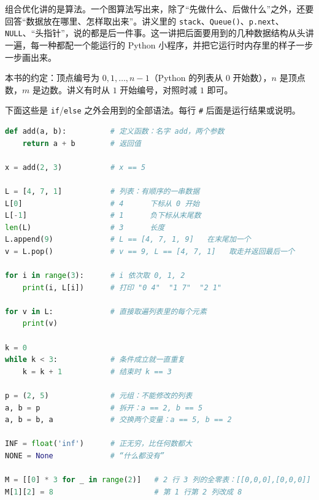 \label{lec:data-structures}

组合优化讲的是算法。一个图算法写出来，除了“先做什么、后做什么”之外，还要回答“数据放在哪里、怎样取出来”。讲义里的 \texttt{stack}、\texttt{Queue()}、\texttt{p.next}、\texttt{NULL}、“头指针”，说的都是后一件事。这一讲把后面要用到的几种数据结构从头讲一遍，每一种都配一个能运行的 Python 小程序，并把它运行时内存里的样子一步一步画出来。

本书的约定：顶点编号为 $0,1,\dots,n-1$（Python 的列表从 $0$ 开始数），$n$ 是顶点数，$m$ 是边数。讲义有时从 $1$ 开始编号，对照时减 $1$ 即可。


下面这些是 \texttt{if}/\texttt{else} 之外会用到的全部语法。每行 \texttt{\#} 后面是运行结果或说明。

\begin{lstlisting}[language=Python,style=frag]
def add(a, b):          # 定义函数：名字 add，两个参数
    return a + b        # 返回值

x = add(2, 3)           # x == 5

L = [4, 7, 1]           # 列表：有顺序的一串数据
L[0]                    # 4      下标从 0 开始
L[-1]                   # 1      负下标从末尾数
len(L)                  # 3      长度
L.append(9)             # L == [4, 7, 1, 9]   在末尾加一个
v = L.pop()             # v == 9, L == [4, 7, 1]   取走并返回最后一个

for i in range(3):      # i 依次取 0, 1, 2
    print(i, L[i])      # 打印 "0 4"  "1 7"  "2 1"

for v in L:             # 直接取遍列表里的每个元素
    print(v)

k = 0
while k < 3:            # 条件成立就一直重复
    k = k + 1           # 结束时 k == 3

p = (2, 5)              # 元组：不能修改的列表
a, b = p                # 拆开：a == 2, b == 5
a, b = b, a             # 交换两个变量：a == 5, b == 2

INF = float('inf')      # 正无穷，比任何数都大
NONE = None             # “什么都没有”

M = [[0] * 3 for _ in range(2)]   # 2 行 3 列的全零表：[[0,0,0],[0,0,0]]
M[1][2] = 8                       # 第 1 行第 2 列改成 8
\end{lstlisting}

